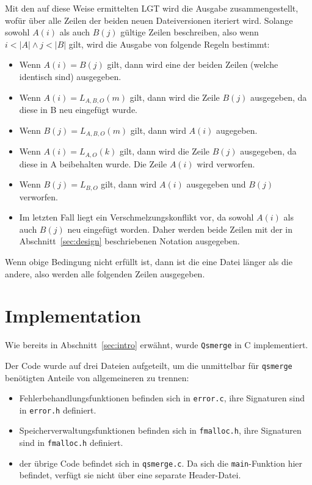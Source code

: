 \documentclass[a4paper,titlepage,12pt]{scrartcl}
\begin{document}
Mit den auf diese Weise ermittelten LGT wird die Ausgabe zusammengestellt,
wofür über alle Zeilen der beiden neuen Dateiversionen iteriert wird.
Solange sowohl $A(i)$ als auch $B(j)$ gültige Zeilen beschreiben,
also wenn $i < |A| \wedge j < |B|$ gilt,
wird die Ausgabe von folgende Regeln bestimmt:
\begin{itemize}
\item Wenn $A(i) = B(j)$ gilt,
dann wird eine der beiden Zeilen (welche identisch sind) ausgegeben.
\item Wenn $A(i) = L_{A,B,O}(m)$ gilt,
dann wird die Zeile $B(j)$ ausgegeben,
da diese in B neu eingefügt wurde.
\item Wenn $B(j) = L_{A,B,O}(m)$ gilt,
dann wird $A(i)$ augegeben.
\item Wenn $A(i) = L_{A,O}(k)$ gilt,
dann wird die Zeile $B(j)$ ausgegeben,
da diese in A beibehalten wurde.
Die Zeile $A(i)$ wird verworfen.
\item Wenn $B(j) = L_{B,O}$ gilt,
dann wird $A(i)$ ausgegeben und $B(j)$ verworfen.
\item Im letzten Fall liegt ein Verschmelzungskonflikt vor,
da sowohl $A(i)$ als auch $B(j)$ neu eingefügt worden.
Daher werden beide Zeilen mit der in Abschnitt~\ref{sec:design} beschriebenen Notation ausgegeben.
\end{itemize}
Wenn obige Bedingung nicht erfüllt ist,
dann ist die eine Datei länger als die andere,
also werden alle folgenden Zeilen ausgegeben.

\section{Implementation}
\label{sec:implementation}
Wie bereits in Abschnitt~\ref{sec:intro} erwähnt,
wurde \texttt{Qsmerge} in C implementiert.

Der Code wurde auf drei Dateien aufgeteilt,
um die unmittelbar für \texttt{qsmerge} benötigten Anteile von allgemeineren zu trennen:
\begin{itemize}
\item Fehlerbehandlungsfunktionen befinden sich in \texttt{error.c},
ihre Signaturen sind in \texttt{error.h} definiert.
\item Speicherverwaltungsfunktionen befinden sich in \texttt{fmalloc.h},
ihre Signaturen sind in \texttt{fmalloc.h} definiert.
\item der übrige Code befindet sich in \texttt{qsmerge.c}.
Da sich die \texttt{main}-Funktion hier befindet,
verfügt sie nicht über eine separate Header-Datei.
\end{itemize}
\end{document}
